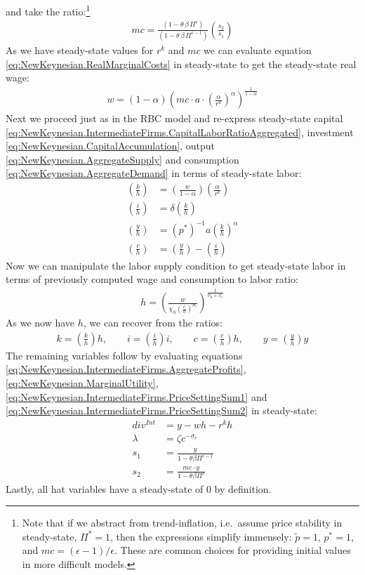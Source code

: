   and take the ratio:\footnote{
Note that if we abstract from trend-inflation, i.e.\ assume price stability in steady-state, $\Pi^*=1$,
  then the expressions simplify immensely: $\widetilde{p} = 1$, $p^*=1$, and $mc = (\epsilon-1)/\epsilon$.
These are common choices for providing initial values in more difficult models.
}
\begin{align*}
{mc} = \frac{\left(1-{{\theta}}\, {{\beta}}\, {{\Pi}}^{{{\epsilon}}}\right)}{ \left( 1-{{\theta}}\, {{\beta}}\, {{\Pi}}^{{{\epsilon}}-1} \right)} \left(\frac{s_2}{s_1}\right)
\end{align*}
As we have steady-state values for $r^k$ and $mc$ we can evaluate equation \eqref{eq:NewKeynesian.RealMarginalCosts} in steady-state to get the steady-state real wage:
\begin{align*}
w = (1-\alpha) \left(mc \cdot a \cdot \left(\frac{\alpha}{r^k}\right)^\alpha \right)^{\frac{1}{1-\alpha}}
\end{align*}
Next we proceed just as in the RBC model and re-express steady-state capital \eqref{eq:NewKeynesian.IntermediateFirms.CapitalLaborRatioAggregated},
  investment \eqref{eq:NewKeynesian.CapitalAccumulation}, output \eqref{eq:NewKeynesian.AggregateSupply} and consumption \eqref{eq:NewKeynesian.AggregateDemand}
  in terms of steady-state labor:
\begin{align*}
\left(\frac{k}{h}\right) &= \left(\frac{w}{1-\alpha}\right) \left(\frac{\alpha}{r^k}\right)
\\
\left(\frac{i}{h}\right) &= \delta \left(\frac{k}{h}\right)
\\
\left(\frac{y}{h}\right) &= (p^*)^{-1} a \left(\frac{k}{h}\right)^\alpha
\\
\left(\frac{c}{h}\right) &= \left(\frac{y}{h}\right) - \left(\frac{i}{h}\right)
\end{align*}
Now we can manipulate the labor supply condition to get steady-state labor in terms of previously computed wage and consumption to labor ratio:
\begin{align*}
h = \left( \frac{w}{\chi_h \left(\frac{c}{h}\right)^{\sigma_c}} \right)^{\frac{1}{\sigma_h+\sigma_c}}
\end{align*}
As we now have $h$, we can recover from the ratios:
\begin{align*}
k = \left(\frac{k}{h}\right) h, \qquad i = \left(\frac{i}{h}\right) i, \qquad c = \left(\frac{c}{h}\right) h, \qquad y = \left(\frac{y}{h}\right) y
\end{align*}
The remaining variables follow by evaluating equations \eqref{eq:NewKeynesian.IntermediateFirms.AggregateProfits},
  \eqref{eq:NewKeynesian.MarginalUtility}, \eqref{eq:NewKeynesian.IntermediateFirms.PriceSettingSum1} and \eqref{eq:NewKeynesian.IntermediateFirms.PriceSettingSum2}
  in steady-state:
\begin{align*}
div^{Int} &= y - w h - r^k h
\\
\lambda &= \zeta c^{-\sigma_c}
\\
s_1 &= \frac{y}{1- \theta \beta \Pi^{\epsilon-1}}
\\
s_2 &= \frac{mc \cdot y}{1- \theta \beta \Pi^{\epsilon}}
\end{align*}
Lastly, all hat variables have a steady-state of 0 by definition.

